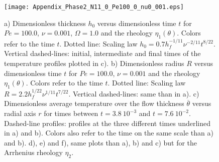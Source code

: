 \begin{figure}[htpb]
  \begin{center}
    \graphicspath{ {/Users/thorey/Documents/These/Projet/Refroidissement/Skin_Model/Figure/Figure_Heating/} }
    \texttt{[image: Appendix\_Phase2\_N11\_0\_Pe100\_0\_nu0\_001.eps]}
    \caption{a)  Dimensionless  thickness $h_0$  versus  dimensionless
      time  $t$  for  $Pe=100.0$, $\nu=0.001$,  $\Omega=1.0$  and  the
      rheology  $\eta_1(\theta)$.   Colors  refer  to  the  time  $t$.
      Dotted              line:               Scaling              law
      $h_0= 0.7h_f^{-1/11}\nu^{-2/11}t^{8/22}$. Vertical dashed-lines:
      initial,  intermediate  and  final   times  of  the  temperature
      profiles  plotted in  c).   b) Dimensionless  radius $R$  versus
      dimensionless  time  $t$  for $Pe=100.0$,  $\nu=0.001$  and  the
      rheology  $\eta_1(\theta)$.   Colors  refer  to  the  time  $t$.
      Dotted line:  Scaling law  $R= 2.2h_f^{1/22}\nu^{1/11}t^{7/22}$.
      Vertical dashed-lines: same than in a). c) Dimensionless average
      temperature over  the flow thickness  $\overline{\theta}$ versus
      radial   axis  $r$   for  times   between  $t=3.8~10^{-3}$   and
      $t=7.6~10^{-2}$.   Dashed-line profiles:  profiles at  the three
      different times underlined in a) and b). Colors also refer to
      the time on the same scale than  a) and b).  d), e) and f), same
      plots  than  a),  b)  and  c) but  for  the  Arrhenius  rheology
      $\eta_2$.}
    \label{C4-Appendix_Phase2_N11_0_Pe100_0_nu0_001}
  \end{center}
\end{figure}

\newpage





